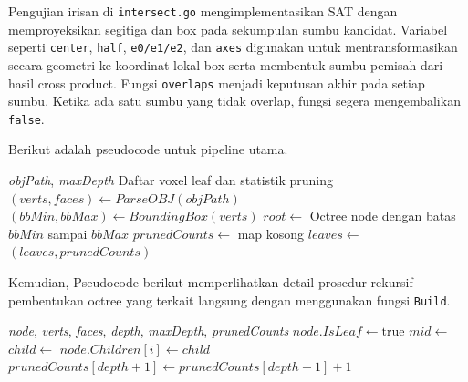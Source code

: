 Pengujian irisan di \texttt{intersect.go} mengimplementasikan SAT dengan memproyeksikan segitiga dan box pada sekumpulan sumbu kandidat. Variabel seperti \texttt{center}, \texttt{half}, \texttt{e0/e1/e2}, dan \texttt{axes} digunakan untuk mentransformasikan secara geometri ke koordinat lokal box serta membentuk sumbu pemisah dari hasil cross product. Fungsi \texttt{overlaps} menjadi keputusan akhir pada setiap sumbu. Ketika ada satu sumbu yang tidak overlap, fungsi segera mengembalikan \texttt{false}.

Berikut adalah pseudocode untuk pipeline utama.

\begin{algorithm}[H]
    \caption{Pipeline Voxelisasi Berbasis Octree}
    \begin{algorithmic}[1]
        \Require \textit{objPath}, \textit{maxDepth}
        \Ensure Daftar voxel leaf dan statistik pruning
        \State $(verts, faces) \gets ParseOBJ(objPath)$
        \State $(bbMin, bbMax) \gets BoundingBox(verts)$
        \State $root \gets$ Octree node dengan batas $bbMin$ sampai $bbMax$
        \State $prunedCounts \gets$ map kosong
        \State {}
        \State $leaves \gets$ 
        \State {}
        \State \Return $(leaves, prunedCounts)$
    \end{algorithmic}
\end{algorithm}

Kemudian, Pseudocode berikut memperlihatkan detail prosedur rekursif pembentukan octree yang terkait langsung dengan menggunakan fungsi \texttt{Build}.

\begin{algorithm}[H]
    \caption{Build Node Octree Dengan Pruning Irisan}
    \begin{algorithmic}[1]
        \Require \textit{node}, \textit{verts}, \textit{faces}, \textit{depth}, \textit{maxDepth}, \textit{prunedCounts}
        \State $node.IsLeaf \gets \text{true}$
        \State \Return
        \EndIf
        \State $mid \gets$ 
        \State $child \gets$ 
        \State $node.Children[i] \gets child$
        \State {}
        \Else
        \State $prunedCounts[depth+1] \gets prunedCounts[depth+1] + 1$
        \EndIf
        \EndFor
    \end{algorithmic}
\end{algorithm}

